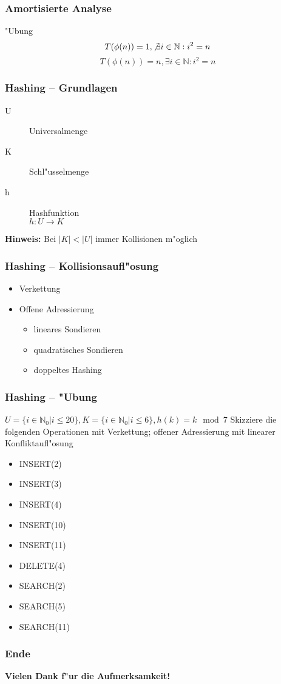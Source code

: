 \documentclass{beamer}
\begin{document}
\begin{frame}
\frametitle{Amortisierte Analyse}
\pause
\begin{exampleblock}{"Ubung}
$$T(\phi(n)) = 1 , \not\exists i \in \mathbb{N} : i^2 = n$$
$$T(\phi(n)) = n , \exists i \in \mathbb{N} : i^2 = n$$
\end{exampleblock}
\end{frame}


\begin{frame}
\frametitle{Hashing -- Grundlagen}
\begin{block}{}
\begin{description}
\item[U] Universalmenge
\item[K] Schl"usselmenge
\item[h] Hashfunktion\\$h : U \rightarrow K$
\end{description}
\pause
\textbf{Hinweis:} Bei $\left|K\right| < \left|U\right|$ \alert{immer} Kollisionen m"oglich 
\end{block}
\end{frame}


\begin{frame}
\frametitle{Hashing -- Kollisionsaufl"osung}
\begin{block}{}
\begin{itemize}
\item Verkettung
\item Offene Adressierung
\begin{itemize}
\item lineares Sondieren
\item quadratisches Sondieren
\item doppeltes Hashing
\end{itemize}
\end{itemize}
\end{block}
\end{frame}


\begin{frame}
\frametitle{Hashing -- "Ubung}
\begin{exampleblock}{$U = \{ i \in \mathbb{N}_0 | i \leq 20 \}, K = \{ i \in \mathbb{N}_0 | i \leq 6 \}, h(k) = k \mod 7$}
Skizziere die folgenden Operationen mit Verkettung; offener Adressierung mit linearer Konfliktaufl"osung
\begin{itemize}
\item INSERT(2)
\item INSERT(3)
\item INSERT(4)\pause
\item INSERT(10)\pause
\item INSERT(11)\pause
\item DELETE(4)\pause
\item SEARCH(2)\pause
\item SEARCH(5)\pause
\item SEARCH(11)
\end{itemize}
\end{exampleblock}
\end{frame}


\begin{frame}
\frametitle{Ende}
\begin{center}
\textbf{\Huge Vielen Dank f"ur die Aufmerksamkeit!}
\end{center}
\end{frame}
\end{document}
